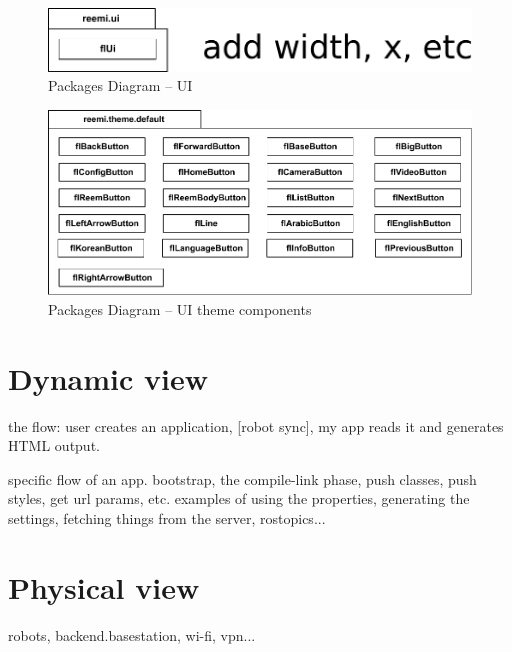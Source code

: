 \begin{figure}[htb]
    \centering
    \includegraphics{figures/design-package-ui.pdf}
    \caption{Packages Diagram -- UI}
    \label{fig:pkg-ui}
\end{figure}

\begin{figure}[htb]
    \centering
    \includegraphics{figures/design-package-uithemecomponents.pdf}
    \caption{Packages Diagram -- UI theme components}
    \label{fig:pkg-themecomponents}
\end{figure}

\FloatBarrier

\section{Dynamic view}
the flow: user creates an application, [robot sync], my app reads it and generates HTML output.

specific flow of an app. bootstrap, the compile-link phase, push classes, push styles, get url params, etc.
examples of using the properties, generating the settings, fetching things from the server, rostopics...

\section{Physical view}
robots, backend.basestation, wi-fi, vpn...

